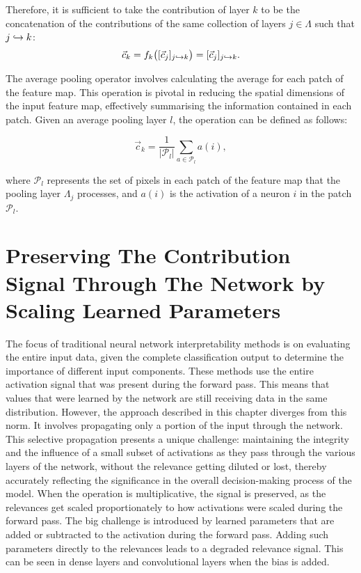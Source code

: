 Therefore, it is sufficient to take the contribution of layer $k$ to be the concatenation of the contributions of the same collection of layers $j\in \Lambda$ such that $j\hookrightarrow k$: 
\begin{equation*}
    \vec{c}_k = f_k\big([\vec{c}_j]_{j\hookrightarrow k}\big) = [\vec{c}_j]_{j\hookrightarrow k}.
\end{equation*}

The average pooling operator involves calculating the average for each patch of the feature map. This operation is pivotal in reducing the spatial dimensions of the input feature map, effectively summarising the information contained in each patch. Given an average pooling layer $l$, the operation can be defined as follows:

\begin{equation*}
    \vec{c}_k = \frac{1}{|\mathcal{P}_l|} \sum_{a \in \mathcal{P}_l} a(i),
\end{equation*}

where $\mathcal{P}_l$ represents the set of pixels in each patch of the feature map that the pooling layer $\Lambda_j$ processes, and $a(i)$ is the activation of a neuron $i$ in the patch $\mathcal{P}_l$.


\section{Preserving The Contribution Signal Through The Network by Scaling Learned Parameters}
\label{sec:scale}

The focus of traditional neural network interpretability methods is on evaluating the entire input data, given the complete classification output to determine the importance of different input components. These methods use the entire activation signal that was present during the forward pass. This means that values that were learned by the network are still receiving data in the same distribution. However, the approach described in this chapter diverges from this norm. It involves propagating only a portion of the input through the network. This selective propagation presents a unique challenge: maintaining the integrity and the influence of a small subset of activations as they pass through the various layers of the network, without the relevance getting diluted or lost, thereby accurately reflecting the significance in the overall decision-making process of the model. When the operation is multiplicative, the signal is preserved, as the relevances get scaled proportionately to how activations were scaled during the forward pass. The big challenge is introduced by learned parameters that are added or subtracted to the activation during the forward pass. Adding such parameters directly to the relevances leads to a degraded relevance signal. This can be seen in dense layers and convolutional layers when the bias is added.


